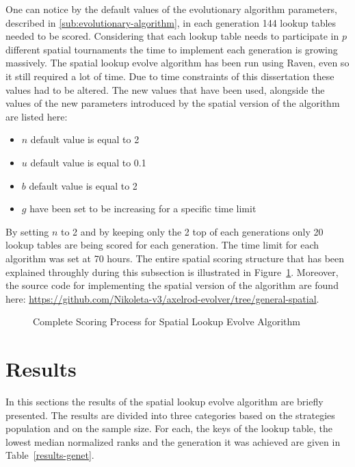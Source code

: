 One can notice by the default values of the evolutionary algorithm parameters,
described in \autoref{sub:evolutionary-algorithm}, in each generation
144 lookup tables needed to be scored. Considering that each lookup table needs
to participate in \(p\) different spatial tournaments the time to implement
each generation is growing massively. The spatial lookup evolve algorithm
has been run using Raven, even so it still required a lot of time. Due to time
constraints of this dissertation these values had to be altered. The new values
that have been used, alongside the values of the new parameters introduced
by the spatial version of the algorithm are listed here:
\begin{itemize}
    \item \(n\) default value is equal to 2
    \item \(u\) default value is equal to 0.1
    \item \(b\) default value is equal to 2
    \item \(g\) have been set to be increasing for a specific time limit
\end{itemize}

By setting \(n\) to 2 and by keeping only the 2 top of each generations only
20 lookup tables are being scored for each generation. The time limit for each algorithm
was set at 70 hours. The entire spatial scoring structure that
has been explained throughly during this subsection is illustrated in Figure~\ref{fig:spatial-evolve}.
Moreover, the source code for implementing the spatial version of the algorithm
are found here: \url{https://github.com/Nikoleta-v3/axelrod-evolver/tree/general-spatial}.

\begin{figure}[H]
		
		\caption{Complete Scoring Process for Spatial Lookup Evolve Algorithm}
  \label{fig:spatial-evolve}
\end{figure}

\section{Results}
\label{sub:results}
In this sections the results of the spatial lookup evolve algorithm are briefly
presented. The results are divided into three categories based on the strategies
population and on the sample size. For each, the keys of the lookup table,
the lowest median normalized ranks and the generation it was achieved are given
in Table~\ref{results-genet}.

